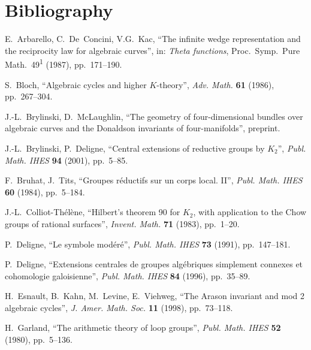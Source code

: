 \documentclass[11pt,a4paper]{article}
\theoremstyle{plain}
\theoremstyle{definition}
\begin{document}
\section*{Bibliography}

\begin{enumerate}[label={[\arabic*]}, leftmargin=*]
\item E.~Arbarello, C.~De~Concini, V.G.~Kac, ``The infinite wedge representation and the reciprocity law for algebraic curves'', in: \textit{Theta functions}, Proc.~Symp.~Pure Math.~49\textsuperscript{1} (1987), pp.~171--190.

\item S.~Bloch, ``Algebraic cycles and higher $K$-theory'', \textit{Adv. Math.} \textbf{61} (1986), pp.~267--304.

\item J.-L.~Brylinski, D.~McLaughlin, ``The geometry of four-dimensional bundles over algebraic curves and the Donaldson invariants of four-manifolds'', preprint.

\item J.-L.~Brylinski, P.~Deligne, ``Central extensions of reductive groups by $K_2$'', \textit{Publ. Math. IHES} \textbf{94} (2001), pp.~5--85.

\item F.~Bruhat, J.~Tits, ``Groupes r\'eductifs sur un corps local. II'', \textit{Publ. Math. IHES} \textbf{60} (1984), pp.~5--184.

\item J.-L.~Colliot-Th\'el\`ene, ``Hilbert's theorem 90 for $K_2$, with application to the Chow groups of rational surfaces'', \textit{Invent. Math.} \textbf{71} (1983), pp.~1--20.

\item P.~Deligne, ``Le symbole mod\'er\'e'', \textit{Publ. Math. IHES} \textbf{73} (1991), pp.~147--181.

\item P.~Deligne, ``Extensions centrales de groupes alg\'ebriques simplement connexes et cohomologie galoisienne'', \textit{Publ. Math. IHES} \textbf{84} (1996), pp.~35--89.

\item H.~Esnault, B.~Kahn, M.~Levine, E.~Viehweg, ``The Arason invariant and mod 2 algebraic cycles'', \textit{J. Amer. Math. Soc.} \textbf{11} (1998), pp.~73--118.

\item H.~Garland, ``The arithmetic theory of loop groups'', \textit{Publ. Math. IHES} \textbf{52} (1980), pp.~5--136.


\end{enumerate}
\end{document}

